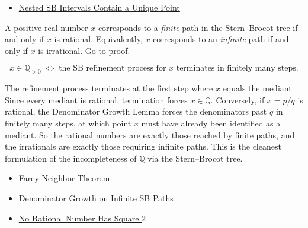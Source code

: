 \begin{dependencies}
\begin{itemize}
  \item \hyperref[prop:sb-unique-point]{Nested SB Intervals Contain a Unique Point}
\end{itemize}
\end{dependencies}

\begin{corollary}
\label{cor:sb-limit-irrational}
A positive real number $x$ corresponds to a \emph{finite} path in the
Stern--Brocot tree if and only if $x$ is rational.  Equivalently, $x$
corresponds to an \emph{infinite} path if and only if $x$ is irrational.
\hyperref[prf:sb-limit-irrational]{Go to proof.}
\end{corollary}

\begin{remark*}
\[
x \in \mathbb{Q}_{>0}
\;\Longleftrightarrow\;
\text{the SB refinement process for } x \text{ terminates in finitely many steps}.
\]
\end{remark*}

\begin{remark*}[Interpretation]
The refinement process terminates at the first step where $x$ equals the
mediant.  Since every mediant is rational, termination forces $x \in \mathbb{Q}$.
Conversely, if $x = p/q$ is rational, the Denominator Growth Lemma forces
the denominators past $q$ in finitely many steps, at which point $x$ must
have already been identified as a mediant.  So the rational numbers are
exactly those reached by finite paths, and the irrationals are exactly those
requiring infinite paths.  This is the cleanest formulation of the
incompleteness of $\mathbb{Q}$ via the Stern--Brocot tree.
\end{remark*}

\begin{dependencies}
\begin{itemize}
  \item \hyperref[thm:farey-neighbor-theorem]{Farey Neighbor Theorem}
  \item \hyperref[lem:sb-denom-growth]{Denominator Growth on Infinite SB Paths}
  \item \hyperref[thm:sqrt2-irrational]{No Rational Number Has Square $2$}
\end{itemize}
\end{dependencies}
